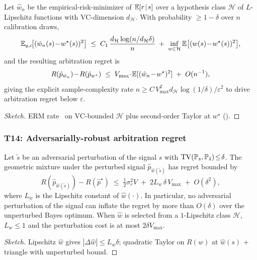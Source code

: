 \begin{theorem}
\label{thm:t13-pac-plugin}
Let $\hat w_n$ be the empirical-risk-minimizer of $\mathbb{E}[r\!\mid\!s]$
over a hypothesis class $\mathcal{H}$ of $L$-Lipschitz functions
with VC-dimension $d_\mathcal{H}$.  With probability $\ge\!1\!-\!\delta$
over $n$ calibration draws,
\[
\mathbb{E}_{q,c}\!\bigl[(\hat w_n(s)\!-\!w^\star(s))^{2}\bigr]
\;\le\;
C_1\,\frac{d_\mathcal{H}\log(n/d_\mathcal{H}\delta)}{n}
\;+\;
\inf_{w\in\mathcal{H}}\mathbb{E}\bigl[(w(s)\!-\!w^\star(s))^{2}\bigr],
\]
and the resulting arbitration regret is
\[
R(\hat p_{\hat w_n})\!-\!R(\hat p_{w^\star})
\;\le\;
V_{\max}\!\cdot\!\mathbb{E}[(\hat w_n\!-\!w^\star)^{2}]
\;+\;O(n^{-1}),
\]
giving the explicit sample-complexity rate
$n\!\ge\!C\,V_{\max}^{2}d_\mathcal{H}\log(1/\delta)/\varepsilon^{2}$
to drive arbitration regret below $\varepsilon$.
\end{theorem}

\begin{proof}[Sketch]
ERM rate~\citep{shalev2014understanding} on VC-bounded $\mathcal{H}$
plus second-order Taylor at $w^\star$ ().
\end{proof}

\subsubsection{T14: Adversarially-robust arbitration regret}
\label{app:t14-adversarial}

\begin{theorem}
\label{thm:t14-adversarial}
Let $\tilde s$ be an adversarial perturbation of the signal $s$
with $\operatorname{TV}(\mathbb{P}_s,\mathbb{P}_{\tilde s})\!\le\!\delta$.  The geometric
mixture under the perturbed signal
$\hat p_{\hat w(\tilde s)}$ has regret bounded by
\[
R(\hat p_{\hat w(\tilde s)})\!-\!R(\hat p^\star)
\;\le\;
\tfrac12\sigma_r^{2}V
\;+\;
2L_w\,\delta\,V_{\max}
\;+\;O(\delta^{2}),
\]
where $L_w$ is the Lipschitz constant of $\hat w(\cdot)$.  In
particular, no adversarial perturbation of the signal can inflate
the regret by more than $O(\delta)$ over the unperturbed Bayes
optimum.  When $\hat w$ is selected from a $1$-Lipschitz class
$\mathcal{H}$, $L_w\!\le\!1$ and the perturbation cost is at most
$2\delta V_{\max}$.
\end{theorem}

\begin{proof}[Sketch]
Lipschitz $\hat w$ gives $|\Delta\hat w|\!\le\!L_w\delta$;
quadratic Taylor on $R(w)$ at $\hat w(s)$ + triangle with
unperturbed bound.
\end{proof}


